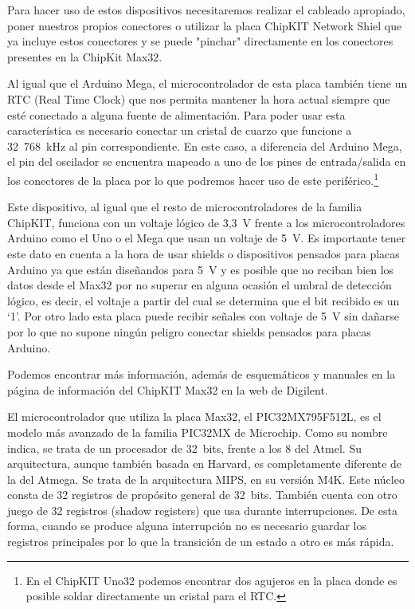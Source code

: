 Para hacer uso de estos dispositivos necesitaremos realizar el cableado apropiado, poner nuestros propios conectores o utilizar la placa ChipKIT Network Shiel que ya incluye estos conectores y se puede "pinchar" directamente en los conectores presentes en la ChipKit Max32. 

Al igual que el Arduino Mega, el microcontrolador de esta placa también tiene un RTC (Real Time Clock) que nos permita mantener la hora actual siempre que esté conectado a alguna fuente de alimentación. Para poder usar esta característica es necesario conectar un cristal de cuarzo que funcione a 32~768~kHz al pin correspondiente. En este caso, a diferencia del Arduino Mega, el pin del oscilador se encuentra mapeado a uno de los pines de entrada/salida en los conectores de la placa por lo que podremos hacer uso de este periférico.\footnote{En el ChipKIT Uno32 podemos encontrar dos agujeros en la placa donde es posible soldar directamente un cristal para el RTC.}

Este dispositivo, al igual que el resto de microcontroladores de la familia ChipKIT, funciona con un voltaje lógico de 3,3~V frente a los microcontroladores Arduino como el Uno o el Mega que usan un voltaje de 5~V. Es importante tener este dato en cuenta a la hora de usar shields o dispositivos pensados para placas Arduino ya que están diseñandos para 5~V y es posible que no reciban bien los datos desde el Max32 por no superar en alguna ocasión el umbral de detección lógico, es decir, el voltaje a partir del cual se determina que el bit recibido es un `1'. Por otro lado esta placa puede recibir señales con voltaje de 5~V sin dañarse por lo que no supone ningún peligro conectar shields pensados para placas Arduino.

Podemos encontrar más información, además de esquemáticos y manuales en la página de información del ChipKIT Max32 en la web de Digilent.\cite{website:max32}

El microcontrolador que utiliza la placa Max32, el PIC32MX795F512L, es el modelo más avanzado de la familia PIC32MX de Microchip. Como su nombre indica, se trata de un procesador de 32~bits, frente a los 8 del Atmel. Su arquitectura, aunque también basada en Harvard, es completamente diferente de la del Atmega. Se trata de la arquitectura MIPS, en su versión M4K. Este núcleo consta de 32 registros de propósito general de 32~bits. También cuenta con otro juego de 32 registros (shadow registers) que usa durante interrupciones. De esta forma, cuando se produce alguna interrupción no es necesario guardar los registros principales por lo que la transición de un estado a otro es más rápida.

